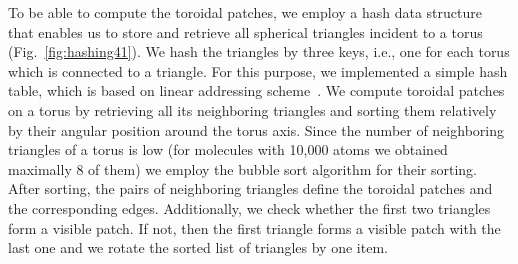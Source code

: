 


To be able to compute the toroidal patches, we employ a hash data structure that enables us to store and retrieve all spherical triangles incident to a torus (Fig.~\ref{fig:hashing41}). 
We hash the triangles by three keys, i.e., one for each torus which is connected to a triangle.
For this purpose, we implemented a simple hash table, which is based on linear addressing scheme~\cite{alcantara2011efficient}.
We compute toroidal patches on a torus by retrieving all its neighboring triangles and sorting them relatively by their angular position around the torus axis.
Since the number of neighboring triangles of a torus is low (for molecules with {\tweakedsim}10,000 atoms we obtained maximally 8 of them) we employ the bubble sort algorithm for their sorting.
After sorting, the pairs of neighboring triangles define the toroidal patches and the corresponding edges.
Additionally, we check whether the first two triangles form a visible patch.
If not, then the first triangle forms a visible patch with the last one and we rotate the sorted list of triangles by one item.

